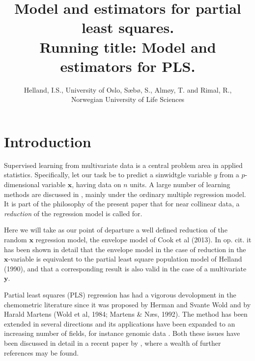 \documentclass[a4paper, 11pt]{article}
\begin{document}
\title{Model and estimators for partial least squares.\\
  Running title: Model and estimators for PLS.}

\author{Helland, I.S., University of Oslo,  S\ae b\o , S., Alm\o y, T.  and Rimal, R.,\\
  Norwegian University of Life Sciences}

\maketitle

\begin{abstract}

\end{abstract}

\setcounter{tocdepth}{1}
\tableofcontents

\onehalfspacing
 
\section{Introduction}

Supervised learning from multivariate data is a central problem area in applied
statistics. Specifically, let our task be to predict a sinwidtgle variable $y$ from
a $p$-dimensional variable $\bm{x}$, having data on $n$ units. A large number of
learning methods are discussed in \citet{hastie2009elements}, mainly under the
ordinary multiple regression model. It is part of the philosophy of the present
paper that for near collinear data, a \emph{reduction} of the regression model
is called for.

Here we will take as our point of departure a well defined reduction of the
random $\bm{x}$ regression model, the envelope model of
\citet{cook2013envelopes} Cook et al (2013). In op. cit. it has been shown in
detail that the envelope model in the case of reduction in the $\bm{x}$-variable
is equivalent to the partial least square population model of
\citet{helland1990partial} Helland (1990), and that a corresponding result is
also valid in the case of a multivariate $\bm{y}$.

Partial least squares (PLS) regression has had a vigorous devolopment in the
chemometric literature since it was proposed by Herman and Svante Wold and by
Harald Martens \citep{wold1984collinearity, martens1992multivariate} (Wold et
al, 1984; Martens \& N\ae s, 1992). The method has been extended in several
directions and its applications have been expanded to an increasing number of
fields, for instance genomic data \citep{boulesteix2007partial}. Both these
issues have been discussed in detail in a recent paper by
\citet{mehmood2016diversity}, where a wealth of further references may be found.
\end{document}

